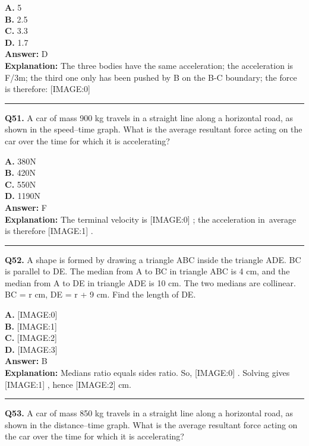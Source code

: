 \documentclass[12pt]{article}
\begin{document}
\textbf{A.} 5 \\
\textbf{B.} 2.5 \\
\textbf{C.} 3.3 \\
\textbf{D.} 1.7 \\

\textbf{Answer:} D \\
\textbf{Explanation:} The three bodies have the same acceleration; the acceleration is F/3m; the third one only has been pushed by B on the B-C boundary; the force is therefore:
[IMAGE:0]

\hrule
\vspace{1em}


\noindent
\textbf{Q51.} A car of mass 900 kg travels in a straight line along a horizontal road, as shown in the speed–time graph.
What is the average resultant force acting on the car over the time for which it is accelerating?



\textbf{A.} 380N \\
\textbf{B.} 420N \\
\textbf{C.} 550N \\
\textbf{D.} 1190N \\

\textbf{Answer:} F \\
\textbf{Explanation:} The terminal velocity is
[IMAGE:0]
; the acceleration in average is therefore
[IMAGE:1]
.

\hrule
\vspace{1em}


\noindent
\textbf{Q52.} A shape is formed by drawing a triangle ABC inside the triangle ADE. BC is parallel to DE. The median from A to BC in triangle ABC is 4 cm, and the median from A to DE in triangle ADE is 10 cm. The two medians are collinear. BC = r cm, DE = r + 9 cm.
Find the length of DE.



\textbf{A.} [IMAGE:0] \\
\textbf{B.} [IMAGE:1] \\
\textbf{C.} [IMAGE:2] \\
\textbf{D.} [IMAGE:3] \\

\textbf{Answer:} B \\
\textbf{Explanation:} Medians ratio equals sides ratio. So,
[IMAGE:0]
. Solving gives
[IMAGE:1]
, hence
[IMAGE:2]
cm.

\hrule
\vspace{1em}


\noindent
\textbf{Q53.} A car of mass 850 kg travels in a straight line along a horizontal road, as shown in the distance–time graph.
What is the average resultant force acting on the car over the time for which it is accelerating?
\end{document}
